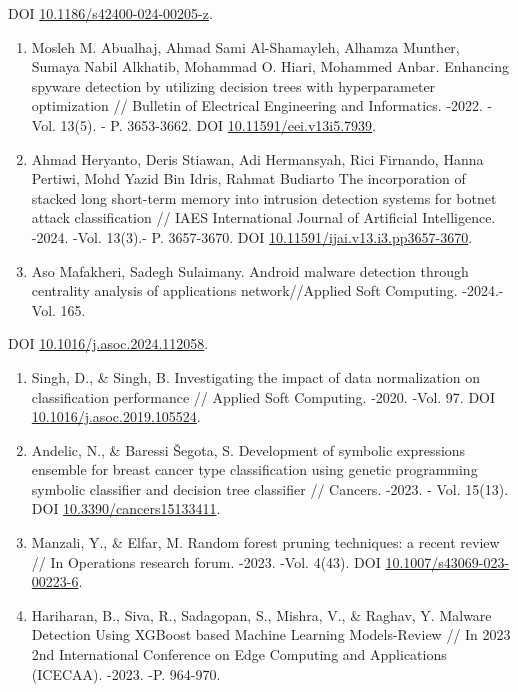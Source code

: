 DOI
\href{https://doi.org/10.1186/s42400-024-00205-z}{10.1186/s42400-024-00205-z}.

\begin{enumerate}
\def\labelenumi{\arabic{enumi}.}
\setcounter{enumi}{8}
\item
  Mosleh M. Abualhaj, Ahmad Sami Al-Shamayleh, Alhamza Munther, Sumaya
  Nabil Alkhatib, Mohammad O. Hiari, Mohammed Anbar\emph{.} Enhancing
  spyware detection by utilizing decision trees with hyperparameter
  optimization // Bulletin of Electrical Engineering and Informatics.
  -2022. -Vol. 13(5). - P. 3653-3662. DOI
  \href{https://doi.org/10.11591/eei.v13i5.7939}{10.11591/eei.v13i5.7939}.
\item
  Ahmad Heryanto, Deris Stiawan, Adi Hermansyah, Rici Firnando, Hanna
  Pertiwi, Mohd Yazid Bin Idris, Rahmat Budiarto The incorporation of
  stacked long short-term memory into intrusion detection systems for
  botnet attack classification // IAES International Journal of
  Artificial Intelligence. -2024. -Vol. 13(3).- P. 3657-3670. DOI
  \href{https://doi.org/10.11591/ijai.v13.i3.pp3657-3670}{10.11591/ijai.v13.i3.pp3657-3670}.
\item
  Aso Mafakheri, Sadegh Sulaimany. Android malware detection through
  centrality analysis of applications network//Applied Soft Computing.
  -2024.-Vol. 165.
\end{enumerate}

DOI
\href{https://doi.org/10.1016/j.asoc.2024.112058}{10.1016/j.asoc.2024.112058}.

\begin{enumerate}
\def\labelenumi{\arabic{enumi}.}
\setcounter{enumi}{11}
\item
  Singh, D., \& Singh, B. Investigating the impact of data normalization
  on classification performance // Applied Soft Computing. -2020. -Vol.
  97. DOI
  \href{https://doi.org/10.1016/j.asoc.2019.105524}{10.1016/j.asoc.2019.105524}.
\item
  Andelic, N., \& Baressi Šegota, S. Development of symbolic expressions
  ensemble for breast cancer type classification using genetic
  programming symbolic classifier and decision tree classifier //
  Cancers. -2023. - Vol. 15(13). DOI
  \href{https://doi.org/10.3390/cancers15133411}{10.3390/cancers15133411}.
\item
  Manzali, Y., \& Elfar, M. Random forest pruning techniques: a recent
  review // In Operations research forum. -2023. -Vol. 4(43). DOI
  \href{https://doi.org/10.1007/s43069-023-00223-6}{10.1007/s43069-023-00223-6}.
\item
  Hariharan, B., Siva, R., Sadagopan, S., Mishra, V., \& Raghav, Y.
  Malware Detection Using XGBoost based Machine Learning Models-Review
  // In 2023 2nd International Conference on Edge Computing and
  Applications (ICECAA). -2023. -P. 964-970.
\end{enumerate}

